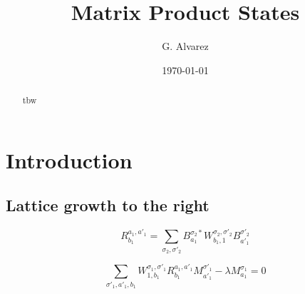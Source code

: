 \documentclass[showpacs,preprintnumbers,amsmath,amssymb,superscriptaddress,showkeys,pre]{revtex4}
\begin{document}
\title{Matrix Product States}

\author{G. Alvarez}

\date{\today}%

\begin{abstract}
tbw
\end{abstract}

\maketitle

\section{\label{sec:intro}Introduction}
\subsection{Lattice growth to the right}
\begin{equation}
R_{b_1}^{a_1,a'_1} =  \sum_{\sigma_2,\sigma'_2} B^{\sigma_2 *}_{a_1}
W^{\sigma_2,\sigma'_{2}}_{b_1,1} B^{\sigma'_2}_{a'_1}
\end{equation}

\begin{equation}
\sum_{\sigma'_1,a'_1,b_1} W^{\sigma_1,\sigma'_1}_{1,b_1} R_{b_1}^{a_1,a'_1} M^{\sigma'_1}_{a'_1} - \lambda M^{\sigma_1}_{a_1}=0
\end{equation}
\end{document}
